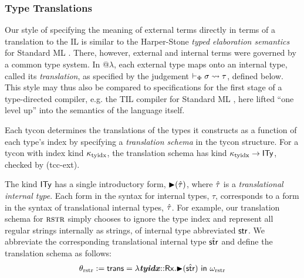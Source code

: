 \documentclass{llncs}
\begin{document}
\subsubsection{Type Translations}
Our style of specifying the meaning of external terms directly in terms of a  translation to the IL is similar to the Harper-Stone \emph{typed elaboration semantics} for Standard ML \cite{Harper00atype-theoretic}. There, however, external and internal terms were governed by a common type system. In @$\lambda$, each external type maps onto an internal type, called its \emph{translation}, as specified by the judgement $\vdash_\Phi \sigma \leadsto \tau$, defined below. This style may thus also be compared to specifications for the first stage of a type-directed compiler, e.g. the TIL compiler for Standard ML \cite{tarditi+:til-OLD}, here lifted ``one level up'' into the semantics of the language itself.

Each tycon determines the translations of the types it constructs as a function of each type's index by specifying a \emph{translation schema} in the {tycon structure}. For a tycon with index kind $\kappa_\text{tyidx}$, the translation schema has kind $\kappa_\text{tyidx} \rightarrow {\sf ITy}$, checked by (tcc-ext). 

The kind ${\sf ITy}$ has a single introductory form, ${\blacktriangleright}(\hat{\tau})$, where $\hat{\tau}$ is a \emph{translational internal type}. Each form in the syntax for internal types, $\tau$,  corresponds to a form in the syntax of translational internal types, $\hat{\tau}$. For example, our translation schema for $\textsc{rstr}$  simply chooses to ignore the type index and represent all regular strings internally as strings, of internal type abbreviated ${\sf str}$. We abbreviate the corresponding translational internal type $\hat{{\sf str}}$ and define the translation schema as follows:
\[
\begin{array}{lcl}
\theta_\text{rstr} := {\sf trans}=\lambda {\textbf{\textit{tyidx}}}{::}{\sf Rx}.{\blacktriangleright}(\hat{{\sf str}})~{\sf in}~\omega_\text{rstr}
\end{array}
\]
\end{document}
